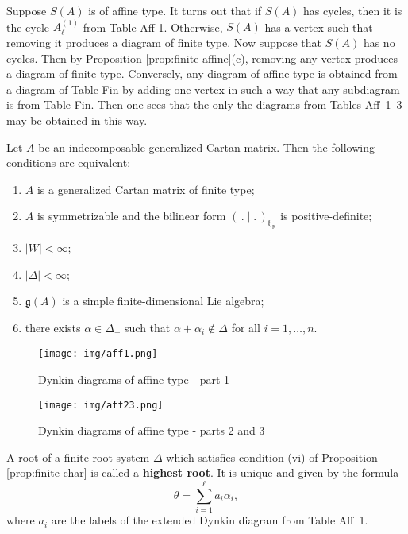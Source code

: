 \documentclass[12pt]{article}
\begin{document}
\begin{remark}
    Suppose $S(A)$ is of affine type. It turns out that if $S(A)$ has cycles, then it is the cycle $A_\ell^{(1)}$ from Table Aff 1. Otherwise, $S(A)$ has a vertex such that removing it produces a diagram of finite type. Now suppose that $S(A)$ has no cycles. Then by Proposition \ref{prop:finite-affine}(c), removing any vertex produces a diagram of finite type. Conversely, any diagram of affine type is obtained from a diagram of Table Fin by adding one vertex in such a way that any subdiagram is from Table Fin. Then one sees that the only the diagrams from Tables Aff~1--3 may be obtained in this way.
\end{remark}

\begin{proposition}\label{prop:finite-char}
    Let $A$ be an indecomposable generalized Cartan matrix. Then the following
    conditions are equivalent:
    \begin{enumerate}[label=(\roman*)]
        \item $A$ is a generalized Cartan matrix of finite type;
        \item $A$ is symmetrizable and the bilinear form $(\,.\mid.\,)_{\mathfrak{h}_\mathbb{R}}$
              is positive-definite;
        \item $|W| < \infty$;
        \item $|\Delta| < \infty$;
        \item $\mathfrak{g}(A)$ is a simple finite-dimensional Lie algebra;
        \item there exists $\alpha \in \Delta_+$ such that $\alpha+\alpha_i \notin \Delta$
              for all $i=1,\dots,n$.
    \end{enumerate}
\end{proposition}

\begin{figure}[H]
    \centering
    \texttt{[image: img/aff1.png]}
    \caption{Dynkin diagrams of affine type - part 1}
\end{figure}

\begin{figure}[H]
    \centering \texttt{[image: img/aff23.png]}
    \caption{Dynkin diagrams of affine type - parts 2 and 3}
\end{figure}


\begin{remark}
    A root of a finite root system $\Delta$ which satisfies condition (vi) of
    Proposition \ref{prop:finite-char} is called a \textbf{highest root}. It is unique and given by
    the formula
    \[
        \theta = \sum_{i=1}^\ell a_i \alpha_i,
    \]
    where $a_i$ are the labels of the extended Dynkin diagram from Table Aff~1.
\end{remark}
\end{document}
